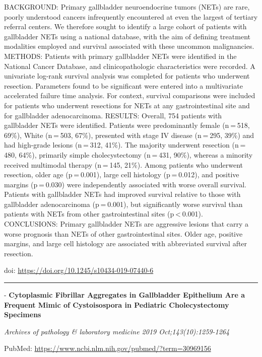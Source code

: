 \documentclass[
]{article}
\renewcommand{\linethickness}{0.05em}
\begin{document}
BACKGROUND: Primary gallbladder neuroendocrine tumors (NETs) are rare,
poorly understood cancers infrequently encountered at even the largest
of tertiary referral centers. We therefore sought to identify a large
cohort of patients with gallbladder NETs using a national database, with
the aim of defining treatment modalities employed and survival
associated with these uncommon malignancies. METHODS: Patients with
primary gallbladder NETs were identified in the National Cancer
Database, and clinicopathologic characteristics were recorded. A
univariate log-rank survival analysis was completed for patients who
underwent resection. Parameters found to be significant were entered
into a multivariate accelerated failure time analysis. For context,
survival comparisons were included for patients who underwent resections
for NETs at any gastrointestinal site and for gallbladder
adenocarcinoma. RESULTS: Overall, 754 patients with gallbladder NETs
were identified. Patients were predominantly female (n = 518, 69\%),
White (n = 503, 67\%), presented with stage IV disease (n = 295, 39\%)
and had high-grade lesions (n = 312, 41\%). The majority underwent
resection (n = 480, 64\%), primarily simple cholecystectomy (n = 431,
90\%), whereas a minority received multimodal therapy (n = 145, 21\%).
Among patients who underwent resection, older age (p = 0.001), large
cell histology (p = 0.012), and positive margins (p = 0.030) were
independently associated with worse overall survival. Patients with
gallbladder NETs had improved survival relative to those with
gallbladder adenocarcinoma (p = 0.001), but significantly worse survival
than patients with NETs from other gastrointestinal sites
(p \textless{} 0.001). CONCLUSIONS: Primary gallbladder NETs are
aggressive lesions that carry a worse prognosis than NETs of other
gastrointestinal sites. Older age, positive margins, and large cell
histology are associated with abbreviated survival after resection.

doi: \url{https://doi.org/10.1245/s10434-019-07440-6}

\begin{center}\rule{0.5\linewidth}{\linethickness}\end{center}

- \textbf{Cytoplasmic Fibrillar Aggregates in Gallbladder Epithelium Are
a Frequent Mimic of Cystoisospora in Pediatric Cholecystectomy
Specimens}

\emph{Archives of pathology \& laboratory medicine 2019
Oct;143(10):1259-1264}

PubMed: \url{https://www.ncbi.nlm.nih.gov/pubmed/?term=30969156}
\end{document}
